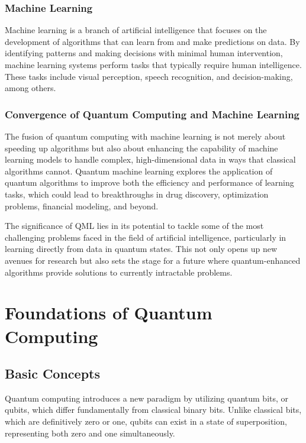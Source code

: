 \documentclass{book}
\begin{document}
\subsubsection{Machine Learning}
Machine learning is a branch of artificial intelligence that focuses on the development of algorithms that can learn from and make predictions on data. By identifying patterns and making decisions with minimal human intervention, machine learning systems perform tasks that typically require human intelligence. These tasks include visual perception, speech recognition, and decision-making, among others.

\subsubsection{Convergence of Quantum Computing and Machine Learning}
The fusion of quantum computing with machine learning is not merely about speeding up algorithms but also about enhancing the capability of machine learning models to handle complex, high-dimensional data in ways that classical algorithms cannot. Quantum machine learning explores the application of quantum algorithms to improve both the efficiency and performance of learning tasks, which could lead to breakthroughs in drug discovery, optimization problems, financial modeling, and beyond.

The significance of QML lies in its potential to tackle some of the most challenging problems faced in the field of artificial intelligence, particularly in learning directly from data in quantum states. This not only opens up new avenues for research but also sets the stage for a future where quantum-enhanced algorithms provide solutions to currently intractable problems.



\section{Foundations of Quantum Computing}

\subsection{Basic Concepts}
Quantum computing introduces a new paradigm by utilizing quantum bits, or qubits, which differ fundamentally from classical binary bits. Unlike classical bits, which are definitively zero or one, qubits can exist in a state of superposition, representing both zero and one simultaneously.
\end{document}
